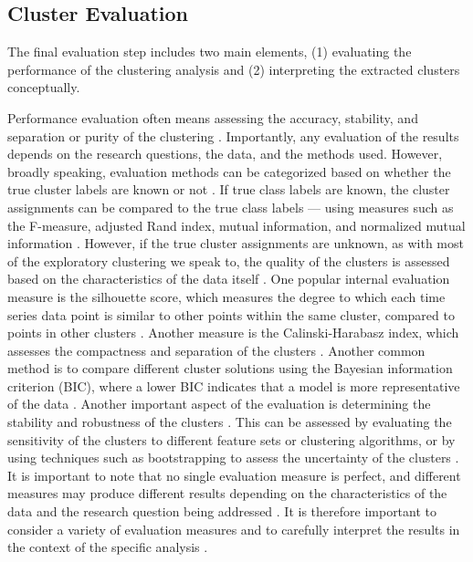 \documentclass[man, 12pt, a4paper, mask, floatsintext]{apa7}
\theoremstyle{break}
\theoremstyle{plain}
\begin{document}




\subsection{Cluster Evaluation}
The final evaluation step includes two main elements, (1) evaluating the performance of the clustering analysis and (2) interpreting the extracted clusters conceptually. 

Performance evaluation often means assessing the accuracy, stability, and separation or purity of the clustering \citep{keogh2003}. Importantly, any evaluation of the results depends on the research questions, the data, and the methods used. However, broadly speaking, evaluation methods can be categorized based on whether the true cluster labels are known or not \citep{saxena2017}. If true class labels are known, the cluster assignments can be compared to the true class labels --- using measures such as the F-measure, adjusted Rand index, mutual information, and normalized mutual information \citep[i.e., external evaluation; e.g.,][]{liao2005}. However, if the true cluster assignments are unknown, as with most of the exploratory clustering we speak to, the quality of the clusters is assessed based on the characteristics of the data itself \citep[i.e., internal evaluation; e.g.,][]{Aghabozorgi2015}. One popular internal evaluation measure is the silhouette score, which measures the degree to which each time series data point is similar to other points within the same cluster, compared to points in other clusters \citep{rousseeuw1987}. Another measure is the Calinski-Harabasz index, which assesses the compactness and separation of the clusters \citep{calinski1974}. Another common method is to compare different cluster solutions using the Bayesian information criterion (BIC), where a lower BIC indicates that a model is more representative of the data \citep{vandeschoot2017}. Another important aspect of the evaluation is determining the stability and robustness of the clusters \citep{berkhin2006}. This can be assessed by evaluating the sensitivity of the clusters to different feature sets or clustering algorithms, or by using techniques such as bootstrapping to assess the uncertainty of the clusters \citep{vinh2009}. It is important to note that no single evaluation measure is perfect, and different measures may produce different results depending on the characteristics of the data and the research question being addressed \citep{kittler1998}. It is therefore important to consider a variety of evaluation measures and to carefully interpret the results in the context of the specific analysis \citep{vinh2009}.
\end{document}
